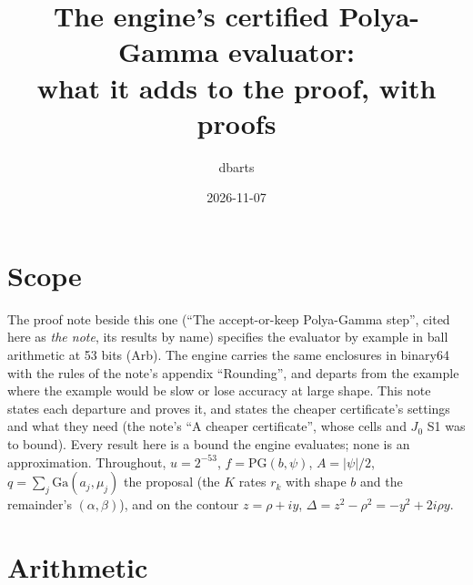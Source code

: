 \documentclass[11pt]{article}
\title{The engine's certified Polya-Gamma evaluator:\\ what it adds to the proof, with proofs}
\author{dbarts}
\date{2026-11-07}
\theoremstyle{definition}
\newcommand{\PG}{\mathrm{PG}}
\newcommand{\Ga}{\mathrm{Ga}}
\begin{document}
\maketitle

\section{Scope}

The proof note beside this one (``The accept-or-keep Polya-Gamma step'', cited here as \emph{the note}, its
results by name) specifies the evaluator by example in ball arithmetic at 53 bits (Arb). The engine carries the
same enclosures in binary64 with the rules of the note's appendix ``Rounding'', and departs from the example where
the example would be slow or lose accuracy at large shape. This note states each departure and proves it, and
states the cheaper certificate's settings and what they need (the note's ``A cheaper certificate'', whose cells and
$J_0$ S1 was to bound). Every result here is a bound the engine evaluates; none is an approximation. Throughout,
$u=2^{-53}$, $f=\PG(b,\psi)$, $A=|\psi|/2$, $q=\sum_j\Ga(a_j,\mu_j)$ the proposal (the $K$ rates $r_k$ with shape
$b$ and the remainder's $(\alpha,\beta)$), and on the contour $z=\rho+iy$, $\Delta=z^2-\rho^2=-y^2+2i\rho y$.

\section{Arithmetic}\label{sec:arith}
\end{document}
